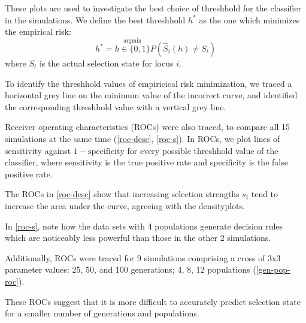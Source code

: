 \documentclass[a4paper,12pt]{article}
\begin{document}
These plots are used to investigate the best choice of threshhold for
the classifier in the simulations. We define the best threshhold $h^*$
as the one which minimizes the empirical risk:
$$
h^* = \stackrel{
  {\textstyle \text{argmin}}}{
  {\scriptstyle h\in\{0,1\}}}
P(\hat{S}_{i}(h)\neq S_i)
$$
where $S_i$ is the actual selection state for locus $i$.

To identify the threshhold values of empiricical risk minimization, we
traced a horizontal grey line on the minimum value of the incorrect
curve, and identified the corresponding threshhold value with a
vertical grey line.

Receiver operating characteristics (ROCs) were also traced, to compare
all 15 simulations at the same time (\autoref{roc-desc},
\autoref{roc-s}). In ROCs, we plot lines of sensitivity against
$1-\text{specificity}$ for every possible threshhold value of the
classifier, where sensitivity is the true positive rate and
specificity is the false positive rate.



The ROCs in \autoref{roc-desc} show that increasing selection
strengths $s_i$ tend to increase the area under the curve, agreeing
with the densityplots.

In \autoref{roc-s}, note how the data sets with 4 populations generate
decision rules which are noticeably less powerful than those in the
other 2 simulations.

Additionally, ROCs were traced for 9 simulations comprising a cross of
3x3 parameter values: 25, 50, and 100 generations; 4, 8, 12
populations (\autoref{gen-pop-roc}).


These ROCs suggest that it is more difficult to accurately predict
selection state for a smaller number of generations and populations.
\end{document}
